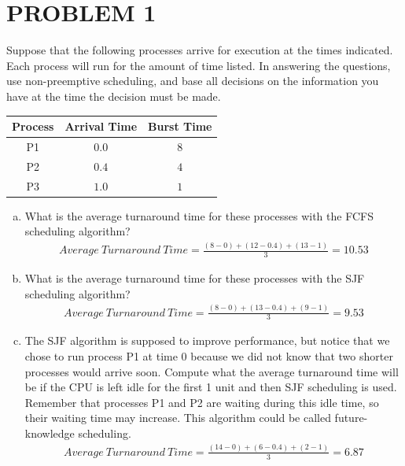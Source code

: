 \documentclass[13pt,a4paper]{article}
\begin{document}
	
	\newpage
	
	
	\section{PROBLEM 1}
		Suppose that the following processes arrive for execution at the times indicated. Each process will run for the amount of time listed. In answering the questions, use non-preemptive scheduling, and base all decisions on the information you have at the time the decision must be made.
		\begin{center}
			 \begin{tabular}{c|c|c}
			 	Process & Arrival Time & Burst Time \\
			 	\hline
			 	P1 & $0.0$ & $8$ \\
			 	P2 & $0.4$ & $4$ \\
			 	P3 & $1.0$ & $1$
			 \end{tabular}
		\end{center}
	 	\begin{enumerate}[a)]
	 		\item  What is the average turnaround time for these processes with the FCFS scheduling algorithm?
	 			\begin{align*}
	 				Average\ Turnaround\ Time = \frac{(8 - 0) + (12 - 0.4) + (13 - 1)}{3} = 10.53
	 			\end{align*}
 			\item What is the average turnaround time for these processes with the SJF scheduling algorithm?
 				\begin{align*}
 					Average\ Turnaround\ Time = \frac{(8 - 0) + (13 - 0.4) + (9 - 1)}{3} = 9.53
 				\end{align*}
 			\item The SJF algorithm is supposed to improve performance, but notice that we chose to run process P1 at time 0 because we did not know that two shorter processes would arrive soon. Compute what the average turnaround time will be if the CPU	is left idle for the first 1 unit and then SJF scheduling is used. Remember that processes P1 and P2 are waiting during this idle time, so their waiting time may increase. This algorithm could be called future-knowledge scheduling.
	 			\begin{align*}
	 				Average\ Turnaround\ Time = \frac{(14 - 0) + (6 - 0.4) + (2 - 1)}{3} = 6.87
	 			\end{align*}	
 		\end{enumerate}
\end{document}
